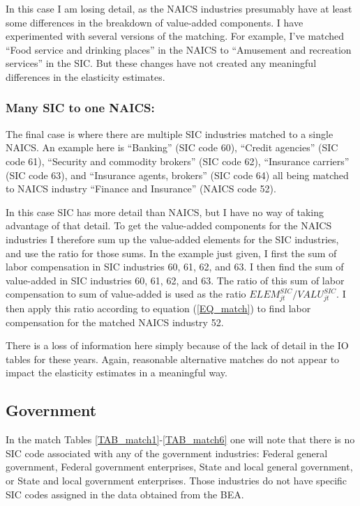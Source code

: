 \documentclass[11pt]{article}
\begin{document}
In this case I am losing detail, as the NAICS industries presumably have at least some differences in the breakdown of value-added components. I have experimented with several versions of the matching. For example, I've matched ``Food service and drinking places'' in the NAICS to ``Amusement and recreation services'' in the SIC. But these changes have not created any meaningful differences in the elasticity estimates.

\subsubsection{Many SIC to one NAICS:} The final case is where there are multiple SIC industries matched to a single NAICS. An example here is ``Banking'' (SIC code 60), ``Credit agencies'' (SIC code 61), ``Security and commodity brokers'' (SIC code 62), ``Insurance carriers'' (SIC code 63), and ``Insurance agents, brokers'' (SIC code 64) all being matched to NAICS industry ``Finance and Insurance'' (NAICS code 52). 

In this case SIC has more detail than NAICS, but I have no way of taking advantage of that detail. To get the value-added components for the NAICS industries I therefore sum up the value-added elements for the SIC industries, and use the ratio for those sums. In the example just given, I first the sum of labor compensation in SIC industries 60, 61, 62, and 63. I then find the sum of value-added in SIC industries 60, 61, 62, and 63. The ratio of this sum of labor compensation to sum of value-added is used as the ratio $ELEM_{jt}^{SIC}/VALU_{jt}^{SIC}$. I then apply this ratio according to equation (\ref{EQ_match}) to find labor compensation for the matched NAICS industry 52. 

There is a loss of information here simply because of the lack of detail in the IO tables for these years. Again, reasonable alternative matches do not appear to impact the elasticity estimates in a meaningful way.

\subsection{Government}
In the match Tables \ref{TAB_match1}-\ref{TAB_match6} one will note that there is no SIC code associated with any of the government industries: Federal general government, Federal government enterprises, State and local general government, or State and local government enterprises. Those industries do not have specific SIC codes assigned in the data obtained from the BEA. 
\end{document}
